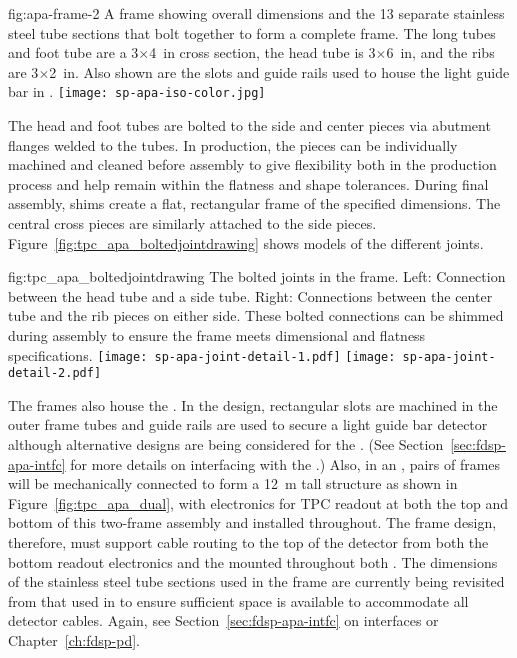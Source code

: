 \begin{dunefigure}{fig:apa-frame-2}
{A   frame showing overall dimensions and the \num{13} separate stainless steel tube sections that bolt together to form a complete frame.  The long tubes and foot tube are a 3$\times$\SI{4}{in} cross section, the head tube is 3$\times$\SI{6}{in}, and the ribs are \num{3}$\times$\SI{2}{in}. Also shown are the slots and guide rails used to house the light guide bar  in .}
\texttt{[image: sp-apa-iso-color.jpg]} 
\end{dunefigure}

The head and foot tubes are bolted to the side and center pieces via abutment flanges welded to the tubes. In production, the pieces can be individually machined and cleaned before assembly to give flexibility both in the production process and help remain within the flatness and shape tolerances.  During final assembly, shims create a flat, rectangular frame of the specified dimensions.  The central cross pieces are similarly attached to the side pieces.  Figure~\ref{fig:tpc_apa_boltedjointdrawing} shows models of the different joints.   

\begin{dunefigure}{fig:tpc_apa_boltedjointdrawing}
{The bolted joints in the  frame. Left: Connection between the head tube and a side tube. Right: Connections between the center tube and the rib pieces on either side.  These bolted connections can be shimmed during assembly to ensure the frame meets dimensional and flatness specifications.}
\texttt{[image: sp-apa-joint-detail-1.pdf]} \quad
\texttt{[image: sp-apa-joint-detail-2.pdf]} 
\end{dunefigure}

The  frames also house the .  In the  design, rectangular slots are machined in the outer frame tubes and guide rails are used to secure a light guide bar detector although alternative  designs are being considered for the . %
(See Section~\ref{sec:fdsp-apa-intfc} for more details on interfacing with the .)   Also, in an , pairs of  frames will be mechanically connected to form a \SI{12}{m} tall structure as shown in Figure~\ref{fig:tpc_apa_dual}, with electronics for TPC readout at both the top and bottom of this two-frame assembly and  installed throughout.  The  frame design, therefore, must support cable routing to the top of the detector from both the bottom  readout electronics and the  mounted throughout both .  The dimensions of the stainless steel tube sections used in the frame are currently being revisited from that used in  to ensure sufficient space is available to accommodate all detector cables.  Again, see Section~\ref{sec:fdsp-apa-intfc} on interfaces or Chapter~\ref{ch:fdsp-pd}.

